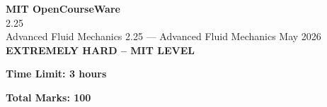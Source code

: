 \documentclass[12pt,a4paper]{exam}
\begin{document}
\begin{center}
{\LARGE \textbf{MIT OpenCourseWare}}\\2.25\\Advanced Fluid Mechanics
\vspace{0.5cm}
{2.25} --- {Advanced Fluid Mechanics}
\vspace{0.3cm}
May 2026
\vspace{0.3cm}
\textbf{EXTREMELY HARD -- MIT LEVEL}
\end{center}

\begin{center}
\textbf{Time Limit: 3 hours}
\end{center}

\begin{center}
\textbf{Total Marks: 100}
\end{center}

\vspace{0.5cm}
\end{document}

